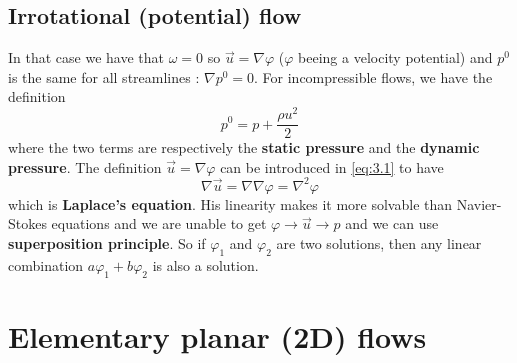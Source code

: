 	\subsection{Irrotational (potential) flow}
		In that case we have that $\omega = 0$ so $\vec{u} = \nabla \varphi$  ($\varphi$ beeing a velocity potential) and $p^0$ is the same for all streamlines : $\nabla p^0 = 0$. For incompressible flows, we have the definition 
		\begin{equation}
			p^0 = p+\frac{\rho u^2}{2}
		\end{equation}
		where the two terms are respectively the \textbf{static pressure} and the \textbf{dynamic pressure}. The definition $\vec{u}=\nabla \varphi$ can be introduced in \eqref{eq:3.1} to have 
		\begin{equation}
			\nabla \vec{u} = \nabla \nabla \varphi = \nabla ^2 \varphi
		\end{equation}
		which is \textbf{Laplace's equation}. His linearity makes it more solvable than Navier-Stokes equations and we are unable to get $\varphi \rightarrow \vec{u} \rightarrow p$ and we can use \textbf{superposition principle}. So if $\varphi _1$ and $\varphi _2$ are two solutions, then any linear combination $a\varphi _1 + b\varphi _2$ is also a solution. 
		
\section{Elementary planar (2D) flows}
